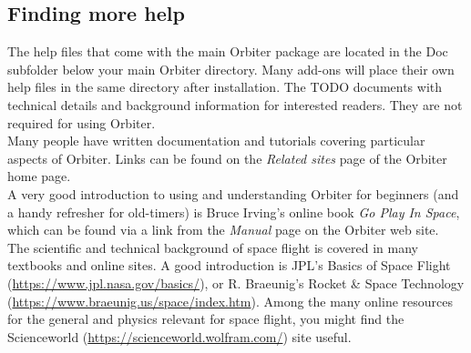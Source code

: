 \documentclass[Orbiter User Manual.tex]{subfiles}
\begin{document}
\subsection{Finding more help}
The help files that come with the main Orbiter package are located in the Doc subfolder below your main Orbiter directory. Many add-ons will place their own help files in the same directory after installation. The TODO documents with technical details and background information for interested readers. They are not required for using Orbiter.\\
Many people have written documentation and tutorials covering particular aspects of Orbiter. Links can be found on the \textit{Related sites} page of the Orbiter home page.\\
A very good introduction to using and understanding Orbiter for beginners (and a handy refresher for old-timers) is Bruce Irving's online book \textit{Go Play In Space}, which can be found via a link from the \textit{Manual} page on the Orbiter web site.\\
The scientific and technical background of space flight is covered in many textbooks and online sites. A good introduction is JPL's Basics of Space Flight (\url{https://www.jpl.nasa.gov/basics/}), or R. Braeunig's Rocket \& Space Technology (\url{https://www.braeunig.us/space/index.htm}). Among the many online resources for the general and physics relevant for space flight, you might find the Scienceworld (\url{https://scienceworld.wolfram.com/}) site useful.
\end{document}
